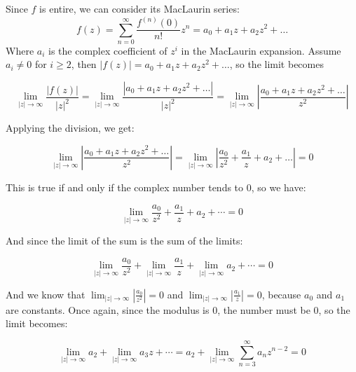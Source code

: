 Since $f$ is entire, we can consider its MacLaurin series:
	      \begin{equation*}
		      f(z) = \sum_{n=0}^{\infty} \frac{f^{(n)}(0)}{n!} z^n =
		      a_0 +
		      a_1z +
		      a_2z^2 + \ldots
	      \end{equation*}
	      Where $a_i$ is the complex coefficient of $z^i$ in the MacLaurin
	      expansion. Assume $a_i \neq 0$ for $i \geq 2$, then $|f(z)| = a_0
		      +
		      a_1z +
		      a_2z^2 + \ldots$, so the limit becomes

	      \begin{equation*}
		      \lim_{|z| \to \infty}\frac{|f(z)|}{|z|^2} = \lim_{|z| \to
			      \infty}\frac{|a_0 + a_1z +
			      a_2z^2 + \ldots|}{|z|^2} = \lim_{|z| \to
			      \infty}\left|\frac{a_0 + a_1z +
			      a_2z^2 + \ldots}{z^2}\right|
	      \end{equation*}

	      Applying the division, we get:

	      \begin{equation*}
		      \lim_{|z| \to \infty}\left|\frac{a_0 + a_1z +
			      a_2z^2 + \ldots}{z^2}\right| = \lim_{|z| \to
			      \infty}\left|\frac{a_0}{z^2} + \frac{a_1}{z} +
		      a_2 + \ldots\right| = 0
	      \end{equation*}

	      This is true if and only if the complex number tends to 0, so we
	      have:

	      \begin{equation*}
		      \lim_{|z| \to \infty}\frac{a_0}{z^2} + \frac{a_1}{z} +
		      a_2 + \cdots = 0
	      \end{equation*}

	      And since the limit of the sum is the sum of the limits:

	      \begin{equation*}
		      \lim_{|z| \to \infty}\frac{a_0}{z^2} + \lim_{|z| \to
			      \infty}\frac{a_1}{z} +
		      \lim_{|z| \to \infty}a_2 + \cdots = 0
	      \end{equation*}

	      And we know that $\lim_{|z| \to
			      \infty}\left|\frac{a_0}{z^2}\right|
		      = 0$ and $\lim_{|z| \to \infty}\left|\frac{a_1}{z}\right|
		      =
		      0$, because $a_0$
	      and $a_1$ are constants. Once again, since the modulus is 0, the
	      number must be 0, so the limit becomes:

	      \begin{equation*}
		      \lim_{|z| \to \infty}a_2 + \lim_{|z| \to \infty}a_3z +
		      \cdots
		      = a_2 + \lim_{|z| \to \infty}\sum_{n=3}^{\infty}a_n
		      z^{n-2} =
		      0
	      \end{equation*}

